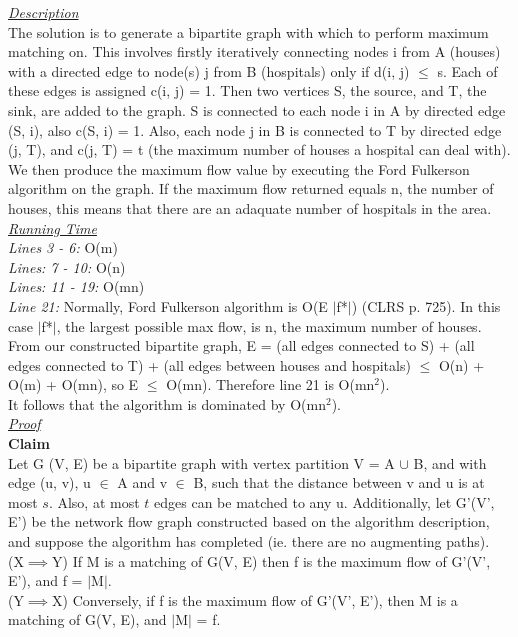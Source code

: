 \documentclass[10pt]{csc_assignment}
\begin{document}
\begin{description}
\begin{algorithm}[H]
\end{algorithm}
\emph{\underline{Description}}\\
The solution is to generate a bipartite graph with which to perform maximum matching on.
This involves firstly iteratively connecting nodes i from A (houses) with a directed edge to node(s) j from B (hospitals) only if  d(i, j) $\leqslant$ s. Each of these edges is assigned c(i, j) = 1. Then two vertices S, the source, and T, the sink, are added to the graph. S is connected to each node i in A by directed edge (S, i), also c(S, i) = 1. Also, each node j in B is connected to T by directed edge (j, T), and c(j, T) = t (the maximum number of houses a hospital can deal with). We then produce the maximum flow value by executing the Ford Fulkerson algorithm on the graph. If the maximum flow returned equals n, the number of houses, this means that there are an adaquate number of hospitals in the area.\\
\emph{\underline{Running Time}}\\
\emph{Lines 3 - 6:} O(m)\\
\emph{Lines: 7 - 10:} O(n)\\
\emph{Lines: 11 - 19:} O(mn)\\
\emph{Line 21:} Normally, Ford Fulkerson algorithm is O(E $\mid$f*$\mid$) (CLRS p. 725). In this case $\mid$f*$\mid$, the largest possible max flow, is n, the maximum number of houses. From our constructed bipartite graph, E = (all edges connected to S) + (all edges connected to T) + (all edges between houses and hospitals) $\leqslant$ O(n) + O(m) + O(mn), so E $\leqslant$ O(mn). Therefore line 21 is O(mn$^{2}$). \\
It follows that the algorithm is dominated by O(mn$^{2}$).\\
\emph{\underline{Proof}}\\
\textbf{Claim}\\
Let G (V, E) be a bipartite graph with vertex partition V = A $\cup$ B, and with edge (u, v), u $\in$ A and v $\in$ B, such that the distance between v and u is at most $s$. Also, at most $t$ edges can be matched to any u. Additionally, let G'(V', E') be the network flow graph constructed based on the algorithm description, and suppose the algorithm has completed (ie. there are no augmenting paths).\\ 
(X$\implies$Y) If M is a matching of G(V, E) then f is the maximum flow of G'(V', E'), and f = $\mid$M$\mid$.\\ 
(Y$\implies$X) Conversely, if f is the maximum flow of G'(V', E'), then M is a matching of G(V, E), and $\mid$M$\mid$ = f. \\

\end{description}
\end{document}
